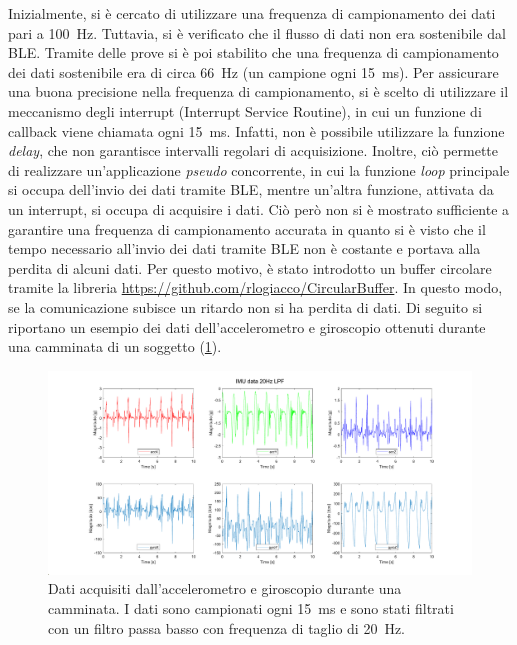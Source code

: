 Inizialmente, si è cercato di utilizzare una frequenza di campionamento dei dati pari a \SI{100}{\hertz}. Tuttavia, si è verificato che il flusso di dati non era sostenibile dal BLE. Tramite delle prove si è poi stabilito che una frequenza di campionamento dei dati sostenibile era di circa \SI{66}{\hertz} (un campione ogni \SI{15}{\milli\second}). Per assicurare una buona precisione nella frequenza di campionamento, si è scelto di utilizzare il meccanismo degli interrupt (Interrupt Service Routine), in cui un funzione di callback viene chiamata ogni \SI{15}{\milli\second}. Infatti, non è possibile utilizzare la funzione \textit{delay}, che non garantisce intervalli regolari di acquisizione. Inoltre, ciò permette di realizzare un'applicazione \textit{pseudo} concorrente, in cui la funzione \textit{loop} principale si occupa dell'invio dei dati tramite BLE, mentre un'altra funzione, attivata da un interrupt, si occupa di acquisire i dati. Ciò però non si è mostrato sufficiente a garantire una frequenza di campionamento accurata in quanto si è visto che il tempo necessario all'invio dei dati tramite BLE non è costante e portava alla perdita di alcuni dati.
Per questo motivo, è stato introdotto un buffer circolare tramite la libreria \url{https://github.com/rlogiacco/CircularBuffer}. In questo modo, se la comunicazione subisce un ritardo non si ha perdita di dati. Di seguito si riportano un esempio dei dati dell'accelerometro e giroscopio ottenuti durante una camminata di un soggetto (\Fig\ref{fig:imu_data}).
\begin{figure}[tbh]
	\centering
	\includegraphics[width=1\linewidth]{./ImageFiles/IMU_data_example.pdf}
	\caption{Dati acquisiti dall'accelerometro e giroscopio durante una camminata. I dati sono campionati ogni \SI{15}{\milli\second} e sono stati filtrati con un filtro passa basso con frequenza di taglio di \SI{20}{\hertz}.}
	\label{fig:imu_data}
\end{figure}
